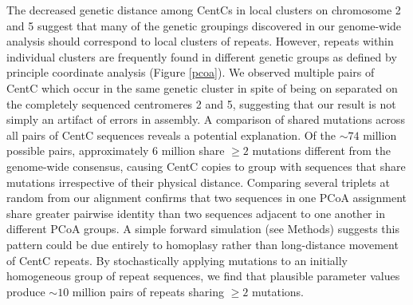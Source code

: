 The decreased genetic distance among CentCs in local clusters on chromosome 2 and 5 suggest that many of the genetic groupings discovered in our genome-wide analysis should correspond to local clusters of repeats. 
However, repeats within individual clusters are frequently found in different genetic groups as defined by principle coordinate analysis (Figure \ref{pcoa}).
We observed multiple pairs of CentC which occur in the same genetic cluster in spite of being on separated on the completely sequenced centromeres 2 and 5, suggesting that our result is not simply an artifact of errors in assembly.
A comparison of shared mutations across all pairs of CentC sequences reveals a potential explanation.  
Of the $\sim 74$ million possible pairs,  approximately 6 million share $\geq 2$ mutations different from the genome-wide consensus, causing CentC copies to group with sequences that share mutations irrespective of their physical distance.  
Comparing several triplets at random from our alignment confirms that two sequences in one PCoA assignment share greater pairwise identity than two sequences adjacent to one another in different PCoA groups.  
A simple forward simulation (see Methods) suggests this pattern could be due entirely to homoplasy rather than long-distance movement of CentC repeats.  
By stochastically applying mutations to an initially homogeneous group of repeat sequences, we find that plausible parameter values produce $\sim 10$ million pairs of repeats sharing $\geq 2$ mutations.

